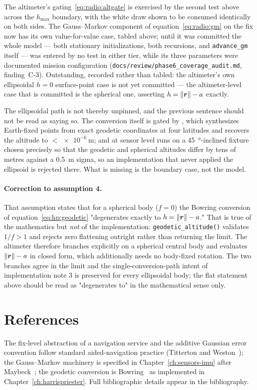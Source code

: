 The altimeter's gating~\eqref{eq:radio:altgate} is exercised by the second
test above across the $h_{\max}$ boundary, with the white draw shown to be
consumed identically on both sides. The Gauss--Markov component of
equation~\eqref{eq:radio:gm} on the fix now has its own value-for-value
case, tabled above; until it was committed the whole model --- both
stationary initializations, both recursions, and \texttt{advance\_gm}
itself --- was entered by no test in either tier, while its three
parameters were documented mission configuration
(\texttt{docs/review/phase6\_coverage\_audit.md}, finding~C-3). Outstanding,
recorded rather than tabled: the altimeter's own
ellipsoidal $h = 0$ surface-point case is not yet committed --- the
altimeter-level case that is committed is the spherical one, asserting
$h = \left\lVert \bm{r} \right\rVert - a$ exactly.

The ellipsoidal path is not thereby unpinned, and the previous sentence
should not be read as saying so. The conversion itself is gated by
, which synthesizes Earth-fixed points from exact
geodetic coordinates at four latitudes and recovers the altitude to
$< \qty{e-6}{\metre}$; and at sensor level
 runs on a
\qty{45}{\degree}-inclined fixture chosen precisely so that the geodetic
and spherical altitudes differ by tens of metres against a
\qty{0.5}{\metre} sigma, so an implementation that never applied the
ellipsoid is rejected there. What is missing is the boundary case, not
the model.

\paragraph{Correction to assumption 4.} That assumption states that for a
spherical body ($f = 0$) the Bowring conversion of
equation~\eqref{eq:hp:geodetic} "degenerates exactly to
$h = \left\lVert \bm{r} \right\rVert - a$." That is true of the mathematics but \emph{not}
of the implementation: \texttt{geodetic\_altitude()} validates
$1/f > 1$ and rejects zero flattening outright rather than returning the
limit. The altimeter therefore branches explicitly on a spherical central
body and evaluates $\left\lVert \bm{r} \right\rVert - a$ in closed form, which additionally
needs no body-fixed rotation. The two branches agree in the limit and the
single-conversion-path intent of implementation note 3 is preserved for
every ellipsoidal body; the flat statement above should be read as
"degenerates to" in the mathematical sense only.

\section{References}
\label{sec:radio:references}

The fix-level abstraction of a navigation service and the additive
Gaussian error convention follow standard aided-navigation practice
(Titterton and Weston~\cite{titterton2004}); the Gauss--Markov machinery
is specified in Chapter~\ref{ch:sensors-imu} after
Maybeck~\cite{maybeck1979}; the geodetic conversion is
Bowring~\cite{bowring1976} as implemented in
Chapter~\ref{ch:harrispriester}. Full bibliographic details appear in
the bibliography.
